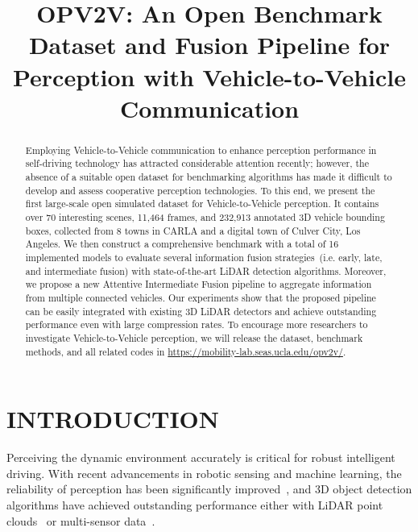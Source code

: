 \title{\LARGE \bf
OPV2V: An Open Benchmark Dataset and Fusion Pipeline for Perception with Vehicle-to-Vehicle Communication}



\maketitle
\thispagestyle{empty}
\pagestyle{empty}

\begin{abstract}

Employing Vehicle-to-Vehicle communication to enhance perception performance in self-driving technology has attracted considerable attention recently; however, the absence of a suitable open dataset for benchmarking algorithms has made it difficult to develop and assess cooperative perception technologies. To this end, we present the first large-scale open simulated dataset for Vehicle-to-Vehicle perception. It contains over 70 interesting scenes, 11,464 frames, and 232,913 annotated 3D vehicle bounding boxes, collected from 8 towns in CARLA and a digital town of Culver City, Los Angeles. We then construct a comprehensive benchmark with a total of 16 implemented models to evaluate several information fusion strategies~(i.e. early, late, and intermediate fusion) with state-of-the-art LiDAR detection algorithms. Moreover, we propose a new Attentive Intermediate Fusion pipeline to aggregate information from multiple connected vehicles. Our experiments show that the proposed pipeline can be easily integrated with existing 3D LiDAR detectors and achieve outstanding performance even with large compression rates. To encourage more researchers to investigate Vehicle-to-Vehicle perception, we will release the dataset, benchmark methods, and all related codes in 
\textcolor{blue}{\href{https://mobility-lab.seas.ucla.edu/opv2v/}{https://mobility-lab.seas.ucla.edu/opv2v/}}.

\end{abstract}

\section{INTRODUCTION}

Perceiving the dynamic environment accurately is critical for robust intelligent driving. With recent advancements in robotic sensing and machine learning, the reliability of perception has been significantly improved~\cite{liu2019auto, he2016deep, qi2017pointnet}, and 3D object detection algorithms have achieved outstanding performance either with LiDAR point clouds~\cite{voxelnet,pointpillar,Shi_2019_CVPR, Shi2020PVRCNNPF} or multi-sensor data~\cite{Liang2009, Liang2018}. 

